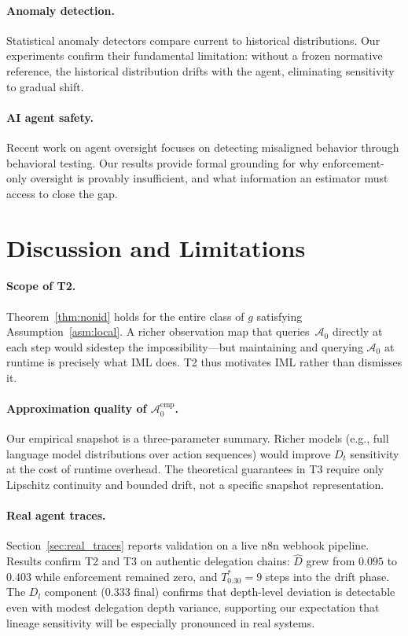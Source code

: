 \documentclass[11pt]{article}
\newcommand{\Azero}{\mathcal{A}_0}
\newcommand{\Dhat}{\widehat{D}}
\begin{document}
\paragraph{Anomaly detection.}
Statistical anomaly detectors \cite{chandola2009anomaly} compare current to
historical distributions.  Our experiments confirm their fundamental limitation:
without a frozen normative reference, the historical distribution drifts with
the agent, eliminating sensitivity to gradual shift.

\paragraph{AI agent safety.}
Recent work on agent oversight \cite{greenblatt2024ai,perez2022red} focuses
on detecting misaligned behavior through behavioral testing.  Our results
provide formal grounding for why enforcement-only oversight is provably
insufficient, and what information an estimator must access to close the gap.

\section{Discussion and Limitations}
\label{sec:discussion}

\paragraph{Scope of T2.}
Theorem~\ref{thm:nonid} holds for the entire class of $g$ satisfying
Assumption~\ref{asm:local}.  A richer observation map that queries~$\Azero$
directly at each step would sidestep the impossibility---but maintaining and
querying $\Azero$ at runtime is precisely what IML does.  T2 thus motivates
IML rather than dismisses it.

\paragraph{Approximation quality of $\Azero^{\mathrm{emp}}$.}
Our empirical snapshot is a three-parameter summary.  Richer models (e.g., full
language model distributions over action sequences) would improve $D_t$
sensitivity at the cost of runtime overhead.  The theoretical guarantees in
T3 require only Lipschitz continuity and bounded drift, not a specific snapshot
representation.

\paragraph{Real agent traces.}
Section~\ref{sec:real_traces} reports validation on a live n8n webhook
pipeline.  Results confirm T2 and T3 on authentic delegation chains:
$\Dhat$ grew from $0.095$ to $0.403$ while enforcement remained zero, and
$T^*_{0.30} = 9$ steps into the drift phase.  The $D_l$ component
($0.333$ final) confirms that depth-level deviation is detectable even with
modest delegation depth variance, supporting our expectation that lineage
sensitivity will be especially pronounced in real systems.
\end{document}
